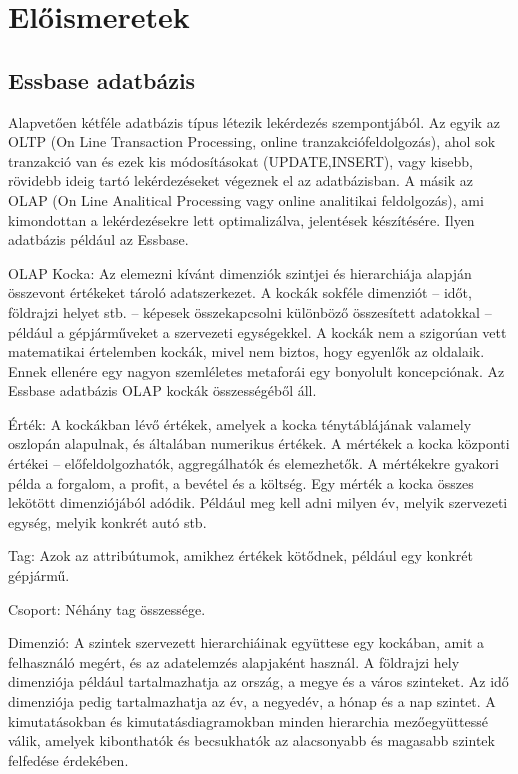 \chapter{Előismeretek}\label{sect:Preliminaries}
\section{Essbase adatbázis}
Alapvetően kétféle adatbázis típus létezik lekérdezés szempontjából. Az egyik az OLTP (On Line Transaction Processing, online tranzakciófeldolgozás), ahol sok tranzakció van és ezek kis módosításokat (UPDATE,INSERT), vagy kisebb, rövidebb ideig tartó lekérdezéseket végeznek el az adatbázisban. A másik az OLAP (On Line Analitical Processing vagy online analitikai feldolgozás), ami kimondottan a lekérdezésekre lett optimalizálva, jelentések készítésére. Ilyen adatbázis például az Essbase.

OLAP Kocka:     Az elemezni kívánt dimenziók szintjei és hierarchiája alapján összevont értékeket tároló adatszerkezet. A kockák sokféle dimenziót – időt, földrajzi helyet stb. – képesek összekapcsolni különböző összesített adatokkal – például a gépjárműveket a szervezeti egységekkel. A kockák nem a szigorúan vett matematikai értelemben kockák, mivel nem biztos, hogy egyenlők az oldalaik. Ennek ellenére egy nagyon szemléletes metaforái egy bonyolult koncepciónak. Az Essbase adatbázis OLAP kockák összességéből áll.

Érték: A kockákban lévő értékek, amelyek a kocka ténytáblájának valamely oszlopán alapulnak, és általában numerikus értékek. A mértékek a kocka központi értékei – előfeldolgozhatók, aggregálhatók és elemezhetők. A mértékekre gyakori példa a forgalom, a profit, a bevétel és a költség. Egy mérték a kocka összes lekötött dimenziójából adódik. Például meg kell adni milyen év, melyik szervezeti egység, melyik konkrét autó stb.

Tag: Azok az attribútumok, amikhez értékek kötődnek, például egy konkrét gépjármű.

Csoport: Néhány tag összessége.

Dimenzió: A szintek szervezett hierarchiáinak együttese egy kockában, amit a felhasználó megért, és az adatelemzés alapjaként használ. A földrajzi hely dimenziója például tartalmazhatja az ország, a megye és a város szinteket. Az idő dimenziója pedig tartalmazhatja az év, a negyedév, a hónap és a nap szintet. A kimutatásokban és kimutatásdiagramokban minden hierarchia mezőegyüttessé válik, amelyek kibonthatók és becsukhatók az alacsonyabb és magasabb szintek felfedése érdekében.

